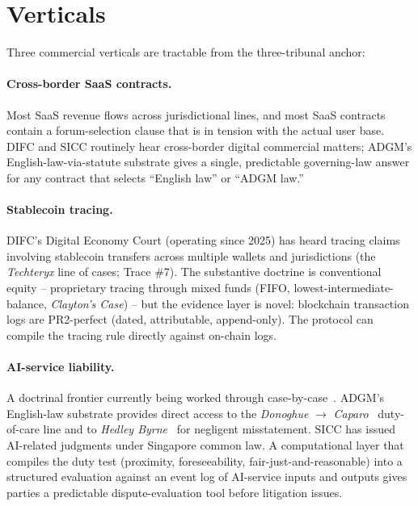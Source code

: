 \documentclass[11pt,letterpaper]{article}
\begin{document}
\section{Verticals}

Three commercial verticals are tractable from the three-tribunal anchor:

\paragraph{Cross-border SaaS contracts.} Most SaaS revenue flows across jurisdictional lines, and most SaaS contracts contain a forum-selection clause that is in tension with the actual user base. DIFC and SICC routinely hear cross-border digital commercial matters; ADGM's English-law-via-statute substrate gives a single, predictable governing-law answer for any contract that selects ``English law'' or ``ADGM law.''

\paragraph{Stablecoin tracing.} DIFC's Digital Economy Court (operating since 2025) has heard tracing claims involving stablecoin transfers across multiple wallets and jurisdictions (the \textit{Techteryx} line of cases; Trace \#7). The substantive doctrine is conventional equity -- proprietary tracing through mixed funds (FIFO, lowest-intermediate-balance, \textit{Clayton's Case}) -- but the evidence layer is novel: blockchain transaction logs are PR2-perfect (dated, attributable, append-only). The protocol can compile the tracing rule directly against on-chain logs.

\paragraph{AI-service liability.} A doctrinal frontier currently being worked through case-by-case~\cite{ashley,susskind-tomorrow}. ADGM's English-law substrate provides direct access to the \textit{Donoghue} $\to$ \textit{Caparo}~\cite{caparo} duty-of-care line and to \textit{Hedley Byrne}~\cite{hedley} for negligent misstatement. SICC has issued AI-related judgments under Singapore common law. A computational layer that compiles the duty test (proximity, foreseeability, fair-just-and-reasonable) into a structured evaluation against an event log of AI-service inputs and outputs gives parties a predictable dispute-evaluation tool before litigation issues.
\end{document}
